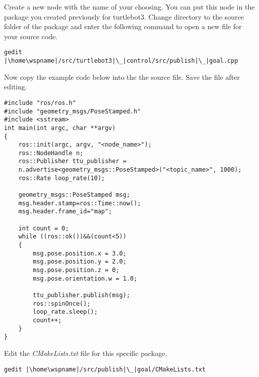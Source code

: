 \documentclass[12pt]{article}
\begin{document}
\begin{description}[labelindent=1cm]
\begin{itemize}
		 
	\end{itemize}
   
\newpage   
    
    \item Create a new node with the name of your choosing. You can put this node in the package you created previously for turtlebot3.  Change directory to the source folder of the package and enter the following command to open a new file for your source code.
\begin{verbatim}
gedit |\home\wspname|/src/turtlebot3|\_|control/src/publish|\_|goal.cpp
\end{verbatim}

    

    \item Now copy the example code below into the the source file. Save the file after editing. \\
    
        \begin{lstlisting}
#include "ros/ros.h"
#include "geometry_msgs/PoseStamped.h"
#include <sstream>
int main(int argc, char **argv)
{
    ros::init(argc, argv, "<node_name>");
    ros::NodeHandle n;
    ros::Publisher ttu_publisher =
    n.advertise<geometry_msgs::PoseStamped>("<topic_name>", 1000);
    ros::Rate loop_rate(10);

    geometry_msgs::PoseStamped msg;
    msg.header.stamp=ros::Time::now();
    msg.header.frame_id="map";

    int count = 0;
    while ((ros::ok())&&(count<5))  
    {               
        msg.pose.position.x = 3.0;
        msg.pose.position.y = 2.0;
        msg.pose.position.z = 0;
        msg.pose.orientation.w = 1.0;

        ttu_publisher.publish(msg);
        ros::spinOnce();
        loop_rate.sleep();
        count++;
    }
}
\end{lstlisting}
    
    \newpage
    
    \item Edit the {\it CMakeLists.txt} file for this specific package. \\
\begin{verbatim}
gedit |\home\wspname|/src/publish|\_|goal/CMakeLists.txt
\end{verbatim}


\end{description}
\end{document}
